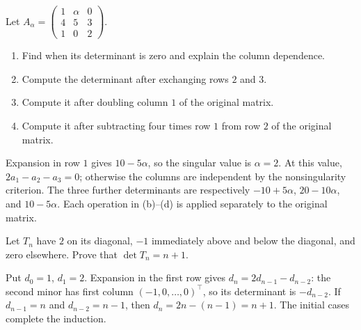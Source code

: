 \begin{problem}\label{ex:07:parameter}
Let \(A_\alpha=\begin{pmatrix}1&\alpha&0\\4&5&3\\1&0&2\end{pmatrix}\).
\begin{enumerate}
\item Find when its determinant is zero and explain the column dependence.
\item Compute the determinant after exchanging rows \(2\) and \(3\).
\item Compute it after doubling column \(1\) of the original matrix.
\item Compute it after subtracting four times row \(1\) from row \(2\) of the original matrix.
\end{enumerate}
\end{problem}
\begin{solution}
Expansion in row \(1\) gives \(10-5\alpha\), so the singular value is
\(\alpha=2\). At this value, \(2a_1-a_2-a_3=0\); otherwise the columns
are independent by the nonsingularity criterion.
The three further determinants are respectively
\(-10+5\alpha\), \(20-10\alpha\), and \(10-5\alpha\).
Each operation in (b)--(d) is applied separately to the original matrix.
\end{solution}

\begin{problem}\label{ex:07:tridiagonal}
Let \(T_n\) have \(2\) on its diagonal, \(-1\) immediately above and below
the diagonal, and zero elsewhere. Prove that \(\det T_n=n+1\).
\end{problem}
\begin{solution}
Put \(d_0=1\), \(d_1=2\). Expansion in the first row gives
\(d_n=2d_{n-1}-d_{n-2}\): the second minor has first column
\((-1,0,\ldots,0)^\top\), so its determinant is \(-d_{n-2}\).
If \(d_{n-1}=n\) and \(d_{n-2}=n-1\), then
\(d_n=2n-(n-1)=n+1\). The initial cases complete the induction.
\end{solution}

